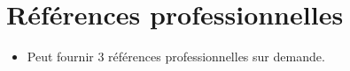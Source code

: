 \documentclass[11pt,a4paper,sans]{moderncv}        %
\begin{document}
\section{Références professionnelles}

\vspace{6pt}
 
\begin{itemize}

\item{Peut fournir 3 références professionnelles sur demande.}

\end{itemize}

\nocite{*}



\end{document}
